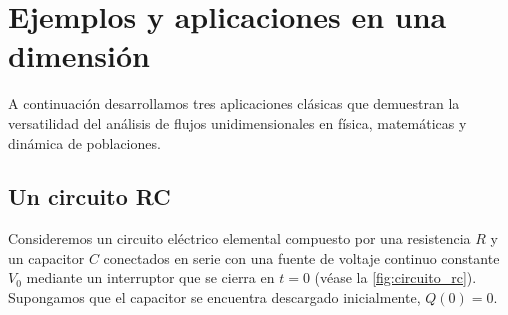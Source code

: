 \section{Ejemplos y aplicaciones en una dimensión}

A continuación desarrollamos tres aplicaciones clásicas que demuestran la versatilidad del análisis de flujos unidimensionales en física, matemáticas y dinámica de poblaciones.

\subsection{Un circuito RC}

Consideremos un circuito eléctrico elemental compuesto por una resistencia $R$ y un capacitor $C$ conectados en serie con una fuente de voltaje continuo constante $V_0$ mediante un interruptor que se cierra en $t=0$ (véase la \cref{fig:circuito_rc}). Supongamos que el capacitor se encuentra descargado inicialmente, $Q(0) = 0$.

